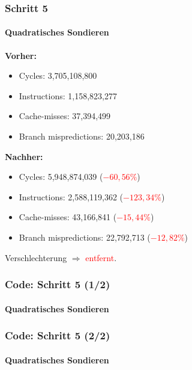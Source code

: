 \documentclass{beamer}
\newcommand{\fail}[1]{\textcolor{red}{#1}}
\begin{document}
  \begin{frame}
  	\frametitle{Schritt 5}
  	\framesubtitle{Quadratisches Sondieren}
  	\textbf{Vorher:}
		\begin{itemize}
			\item Cycles: 3,705,108,800 \\
			\item Instructions: 1,158,823,277\\
			\item Cache-misses: 37,394,499\\
			\item Branch mispredictions: 20,203,186\\
		\end{itemize}	
				
		\textbf{Nachher:}
		\begin{itemize}
			\item Cycles: 5,948,874,039 (\fail{$- 60,56 \%$})\\
			\item Instructions: 2,588,119,362 (\fail{$- 123,34 \%$})\\
			\item Cache-misses: 43,166,841 (\fail{$- 15,44 \%$})\\
			\item Branch mispredictions: 22,792,713 (\fail{$- 12,82 \%$})\\
		\end{itemize}	
		Verschlechterung $\Rightarrow$ \fail{entfernt}.
  \end{frame}
  
  \begin{frame}
  	\frametitle{Code: Schritt 5 (1/2)}
  	\framesubtitle{Quadratisches Sondieren}
		\sQuadratOne
  \end{frame}
  
  \begin{frame}
  	\frametitle{Code: Schritt 5 (2/2)}
  	\framesubtitle{Quadratisches Sondieren}
		\sQuadratTwo
  \end{frame}
  
\end{document}
